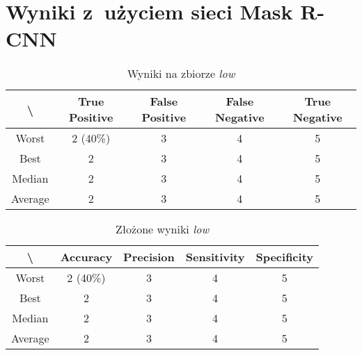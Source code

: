 \newpage
\section{Wyniki z~użyciem sieci Mask R-CNN}

\begin{table}[!h]
	\centering
	\caption{Wyniki na zbiorze \textit{low}}
	\vspace{6pt}
	{\footnotesize
		\begin{tabular}{|c|c|c|c|c|}
			\hline \textbackslash & True Positive & False Positive & False Negative & True Negative \\
      \hline Worst & 2 (40\%) & 3 & 4 & 5 \\
      \hline Best & 2 & 3 & 4 & 5 \\
      \hline Median & 2 & 3 & 4 & 5 \\
      \hline Average & 2 & 3 & 4 & 5 \\
      \hline
		\end{tabular}
	}
	\vspace{0pt}
\end{table}

\vspace{1cm}

\begin{table}[!h]
	\centering
	\caption{Złożone wyniki \textit{low}}
	\vspace{6pt}
	{\footnotesize
		\begin{tabular}{|c|c|c|c|c|}
			\hline \textbackslash & Accuracy & Precision & Sensitivity & Specificity \\
      \hline Worst & 2 (40\%) & 3 & 4 & 5 \\
      \hline Best & 2 & 3 & 4 & 5 \\
      \hline Median & 2 & 3 & 4 & 5 \\
      \hline Average & 2 & 3 & 4 & 5 \\
      \hline
		\end{tabular}
	}
	\vspace{0pt}
\end{table}


